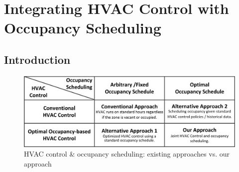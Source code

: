 


\chapter{Integrating HVAC Control with Occupancy Scheduling}
\label{cha:milp}

\section{Introduction}

%  


\begin{figure}[bt]
	\centering
		\includegraphics[width=0.74\linewidth,keepaspectratio]{./figs/mip_taxonomy.jpg}		
	\caption{HVAC control \& occupancy scheduling: existing approaches vs. our approach}
	\label{fig:mip_taxonomy}
\end{figure}

